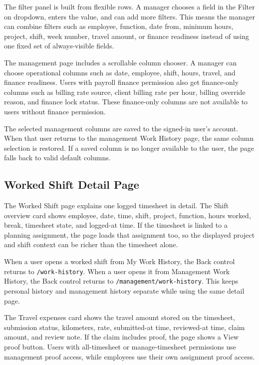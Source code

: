 \documentclass[11pt]{article}
\newcommand{\code}[1]{\nolinkurl{#1}}
\begin{document}
The filter panel is built from flexible rows. A manager chooses a field in the Filter on dropdown, enters the value, and can add more filters. This means the manager can combine filters such as employee, function, date from, minimum hours, project, shift, week number, travel amount, or finance readiness instead of using one fixed set of always-visible fields.

The management page includes a scrollable column chooser. A manager can choose operational columns such as date, employee, shift, hours, travel, and finance readiness. Users with payroll finance permission also get finance-only columns such as billing rate source, client billing rate per hour, billing override reason, and finance lock status. These finance-only columns are not available to users without finance permission.

The selected management columns are saved to the signed-in user's account. When that user returns to the management Work History page, the same column selection is restored. If a saved column is no longer available to the user, the page falls back to valid default columns.

\subsection{Worked Shift Detail Page}

The Worked Shift page explains one logged timesheet in detail. The Shift overview card shows employee, date, time, shift, project, function, hours worked, break, timesheet state, and logged-at time. If the timesheet is linked to a planning assignment, the page loads that assignment too, so the displayed project and shift context can be richer than the timesheet alone.

When a user opens a worked shift from My Work History, the Back control returns to \code{/work-history}. When a user opens it from Management Work History, the Back control returns to \code{/management/work-history}. This keeps personal history and management history separate while using the same detail page.

The Travel expenses card shows the travel amount stored on the timesheet, submission status, kilometers, rate, submitted-at time, reviewed-at time, claim amount, and review note. If the claim includes proof, the page shows a View proof button. Users with all-timesheet or manage-timesheet permissions use management proof access, while employees use their own assignment proof access.
\end{document}
